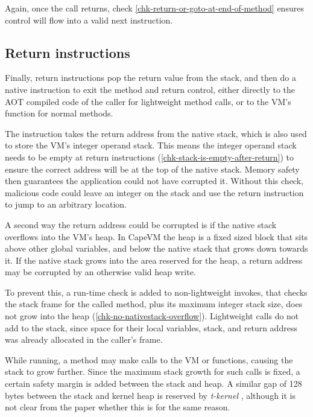 Again, once the call returns, check \ref{chk-return-or-goto-at-end-of-method} ensures control will flow into a valid next instruction.

\subsection{Return instructions}
\label{sec-control-flow-safety-return-instructions}
Finally, return instructions pop the return value from the stack, and then do a native  instruction to exit the method and return control, either directly to the AOT compiled code of the caller for lightweight method calls, or to the VM's  function for normal methods.

The  instruction takes the return address from the native stack, which is also used to store the VM's integer operand stack. This means the integer operand stack needs to be empty at return instructions (\ref{chk-stack-is-empty-after-return}) to ensure the correct address will be at the top of the native stack. Memory safety then guarantees the application could not have corrupted it. Without this check, malicious code could leave an integer on the stack and use the return instruction to jump to an arbitrary location.

A second way the return address could be corrupted is if the native stack overflows into the VM's heap. In CapeVM the heap is a fixed sized block that sits above other global variables, and below the native stack that grows down towards it. If the native stack grows into the area reserved for the heap, a return address may be corrupted by an otherwise valid heap write.

To prevent this, a run-time check is added to non-lightweight invokes, that checks the stack frame for the called method, plus its maximum integer stack size, does not grow into the heap (\ref{chk-no-nativestack-overflow}). Lightweight calls do not add to the stack, since space for their local variables, stack, and return address was already allocated in the caller's frame.

While running, a method may make calls to the VM or  functions, causing the stack to grow further. Since the maximum stack growth for such calls is fixed, a certain safety margin is added between the stack and heap. A similar gap of 128 bytes between the stack and kernel heap is reserved by \emph{t-kernel} \cite{Gu:2005un}, although it is not clear from the paper whether this is for the same reason.




